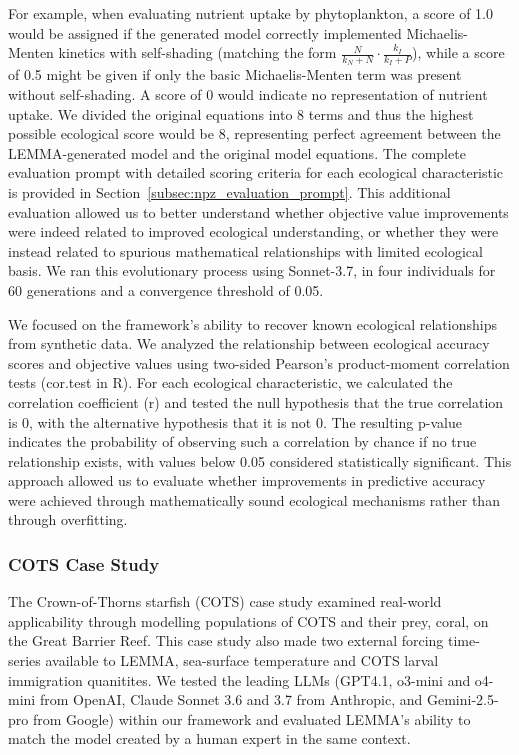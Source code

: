 For example, when evaluating nutrient uptake by phytoplankton, a score of 1.0 would be assigned if the generated model correctly implemented Michaelis-Menten kinetics with self-shading (matching the form $\frac{N}{k_N + N} \cdot \frac{k_I}{k_I + P}$), while a score of 0.5 might be given if only the basic Michaelis-Menten term was present without self-shading. A score of 0 would indicate no representation of nutrient uptake. We divided the original equations into 8 terms and thus the highest possible ecological score would be 8, representing perfect agreement between the LEMMA-generated model and the original model equations. The complete evaluation prompt with detailed scoring criteria for each ecological characteristic is provided in Section~\ref{subsec:npz_evaluation_prompt}. This additional evaluation allowed us to better understand whether objective value improvements were indeed related to improved ecological understanding, or whether they were instead related to spurious mathematical relationships with limited ecological basis. We ran this evolutionary process using Sonnet-3.7, in four individuals for 60 generations and a convergence threshold of 0.05.

We focused on the framework's ability to recover known ecological relationships from synthetic data. We analyzed the relationship between ecological accuracy scores and objective values using two-sided Pearson's product-moment correlation tests (cor.test in R). For each ecological characteristic, we calculated the correlation coefficient (r) and tested the null hypothesis that the true correlation is 0, with the alternative hypothesis that it is not 0. The resulting p-value indicates the probability of observing such a correlation by chance if no true relationship exists, with values below 0.05 considered statistically significant. This approach allowed us to evaluate whether improvements in predictive accuracy were achieved through mathematically sound ecological mechanisms rather than through overfitting.

\subsubsection{COTS Case Study}

The Crown-of-Thorns starfish (COTS) case study examined real-world applicability through modelling populations of COTS and their prey, coral, on the Great Barrier Reef. This case study also made two external forcing time-series available to LEMMA, sea-surface temperature and COTS larval immigration quanitites. We tested the leading LLMs (GPT4.1, o3-mini and o4-mini from OpenAI, Claude Sonnet 3.6 and 3.7 from Anthropic, and Gemini-2.5-pro from Google) within our framework and evaluated LEMMA's ability to match the model created by a human expert in the same context.

